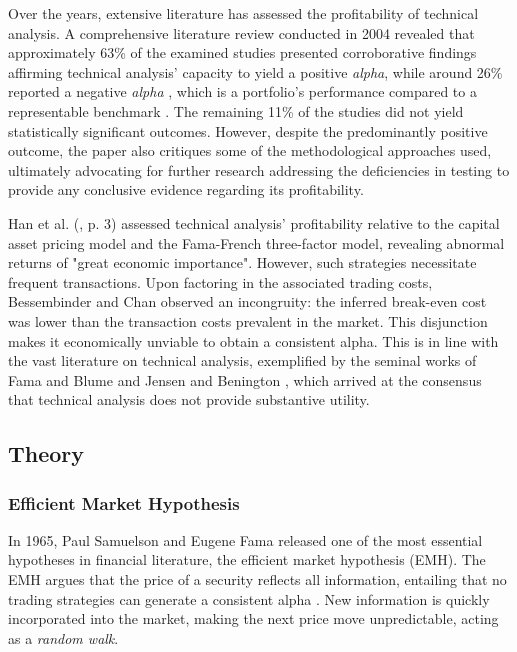 Over the years, extensive literature has assessed the profitability of technical analysis. A comprehensive literature review conducted in 2004 revealed that approximately 63\% of the examined studies presented corroborative findings affirming technical analysis' capacity to yield a positive \textit{alpha}, while around 26\% reported a negative \textit{alpha} \parencite{park2004profitability}, which is a portfolio's performance compared to a representable benchmark \parencite{investopediaAlphaWhat}. The remaining 11\% of the studies did not yield statistically significant outcomes. However, despite the predominantly positive outcome, the paper also critiques some of the methodological approaches used, ultimately advocating for further research addressing the deficiencies in testing to provide any conclusive evidence regarding its profitability. 

Han et al. (\cite*{han2013new}, p. 3) assessed technical analysis' profitability relative to the capital asset pricing model and the Fama-French three-factor model, revealing abnormal returns of "great economic importance". However, such strategies necessitate frequent transactions. Upon factoring in the associated trading costs, Bessembinder and Chan \parencite*{bessembinder1998market} observed an incongruity: the inferred break-even cost was lower than the transaction costs prevalent in the market. This disjunction makes it economically unviable to obtain a consistent alpha. This is in line with the vast literature on technical analysis, exemplified by the seminal works of Fama and Blume \parencite*{fama1966filter} and Jensen and Benington \parencite*{jensen1970random}, which arrived at the consensus that technical analysis does not provide substantive utility. 


\subsection{Theory}

\subsubsection{Efficient Market Hypothesis}
\label{sec:emh}

In 1965, Paul Samuelson and Eugene Fama released one of the most essential hypotheses in financial literature, the efficient market hypothesis (EMH). The EMH argues that the price of a security reflects all information, entailing that no trading strategies can generate a consistent alpha \parencite{jones2008efficient}. New information is quickly incorporated into the market, making the next price move unpredictable, acting as a \textit{random walk}. %

